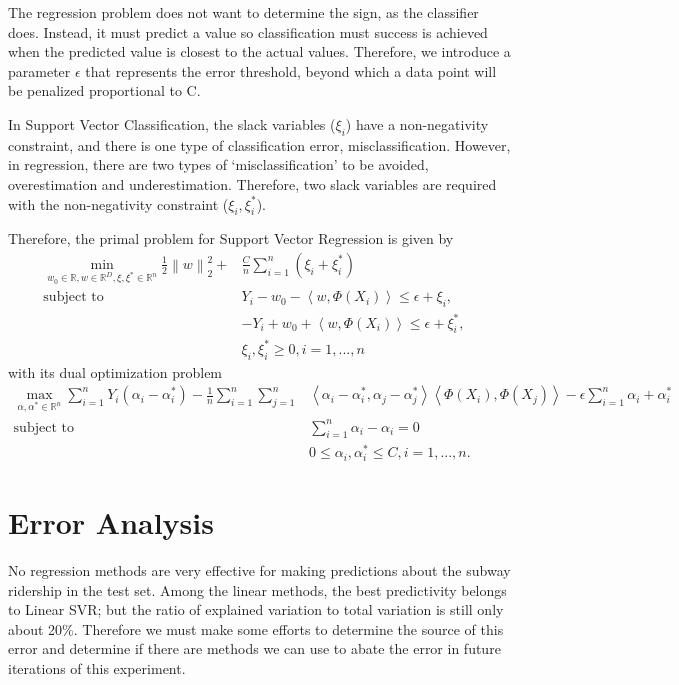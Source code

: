 \documentclass{article}
\begin{document}
The regression problem does not want to determine the sign, as the classifier does. Instead, it must predict a value so classification must success is achieved when the predicted value is closest to the actual values. Therefore, we introduce a parameter $\epsilon$ that represents the error threshold, beyond which a data point will be penalized proportional to C. 

In Support Vector Classification, the slack variables ($\xi_i$) have a non-negativity constraint, and there is one type of classification error, misclassification. However, in regression, there are two types of `misclassification' to be avoided, overestimation and underestimation. Therefore, two slack variables are required with the non-negativity constraint ($\xi_i, \xi_i^*$).

Therefore, the primal problem for Support Vector Regression is given by 
\begin{align*}
\min_{w_0\in\mathbb{R}, w\in\mathbb{R}^D, \xi,\xi^*\in\mathbb{R}^n}\frac{1}{2}\left\lVert w\right\rVert_2^2 + &\frac{C}{n}\sum_{i=1}^n\left(\xi_i+\xi_i^*\right)& \\ 
\text{subject to }&Y_i-w_0 - \left<w,\Phi(X_i)\right> \leq \epsilon + \xi_i, \\
&-Y_i+w_0 + \left<w,\Phi(X_i)\right> \leq \epsilon + \xi_i^*, \\
&\xi_i, \xi_i^*\geq 0, i = 1, ..., n
\end{align*}
with its dual optimization problem
\begin{align*}
\max_{\alpha, \alpha^*\in\mathbb{R}^n}\sum_{i=1}^nY_i\left(\alpha_i-\alpha^*_i\right) - \frac{1}{n}\sum_{i=1}^n\sum_{j=1}^n&\left<\alpha_i-\alpha_i^*, \alpha_j-\alpha_j^*\right>\left<\Phi(X_i), \Phi(X_j)\right> - \epsilon\sum_{i=1}^n\alpha_i+\alpha^*_i\\
\text{subject to }&\sum_{i=1}^n\alpha_i-\alpha_i=0 \\
&0 \leq \alpha_i, \alpha_i^* \leq C, i=1, ... , n.
\end{align*}

\section{Error Analysis}

No regression methods are very effective for making predictions about the subway ridership in the test set. Among the linear methods, the best predictivity belongs to Linear SVR; but the ratio of explained variation to total variation is still only about 20\%. Therefore we must make some efforts to determine the source of this error and determine if there are methods we can use to abate the error in future iterations of this experiment. 
\end{document}
